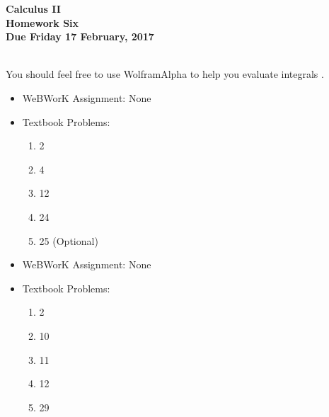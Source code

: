 \documentclass[12pt]{article}
\begin{document}
\pagestyle{empty}
 
\begin{center}
{\large {\bf Calculus II}}\\
\medskip
{\large {\bf Homework Six}}\\
\medskip
{ {\bf Due Friday 17 February, 2017}}\\
\end{center}

 \\ 

You should feel free to use WolframAlpha to help you evaluate integrals . 

\begin{itemize}
\setlength{\itemsep}{0mm}
\item WeBWorK Assignment: None
\item Textbook Problems:
  \begin{enumerate}
  \setlength{\itemsep}{-1mm}
    \item 2
    \item 4
    \item 12
    \item 24
    \item 25 (Optional)
  \end{enumerate}
\end{itemize}

\begin{itemize}
\setlength{\itemsep}{0mm}
\item WeBWorK Assignment: None
\item Textbook Problems:
  \begin{enumerate}
  \setlength{\itemsep}{-1mm}
    \item 2
    \item 10
    \item 11
    \item 12
    \item 29
  \end{enumerate}
\end{itemize}
\end{document}
